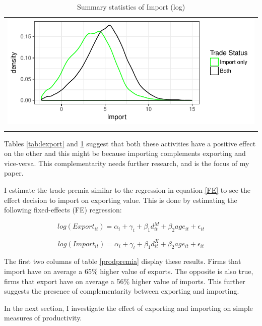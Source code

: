 \documentclass[12pt]{article}
\begin{document}
\begin{center}
\begin{table}[H]
\caption{Summary statistics of Import (log)}
\label{tab:limport}
\begin{tabular}{c}
 \includegraphics{./PICS/denslimport.pdf}   \\ 
   \\  
\end{tabular}
\end{table}
\end{center}

Tables \ref{tab:lexport} and \ref{tab:limport} suggest that both these activities have a
positive effect on the other and this might be because importing
complements exporting and vice-versa. This complementarity needs
further research, and is the focus of my paper. 

I estimate the trade premia similar to the regression in equation
\ref{FE} to see the effect decision to import on exporting value. This is done by estimating the
following fixed-effects (FE) regression:

$$  log(Export_{it}) = \alpha_{i} + \gamma_{t} +  \beta_{1} d_{it}^{M}
+ \beta_{2} age_{it} + \epsilon_{it}$$

$$  log(Import_{it}) = \alpha_{i} + \gamma_{t} + \beta_{1} d_{it}^{X} + \beta_{2} age_{it} + \epsilon_{it}$$ 

\begin{center}

\end{center}

The first two columns of table \ref{prodpremia} display these
results. Firms that  import have on average  a 65\%  higher value of exports. The
opposite is also true, firms that export have on average a 56\% higher
value of imports.  This further suggests the presence of complementarity
between exporting and importing. 

In the next section, I investigate the effect of exporting and importing on
simple measures of productivity.
 
\end{document}
